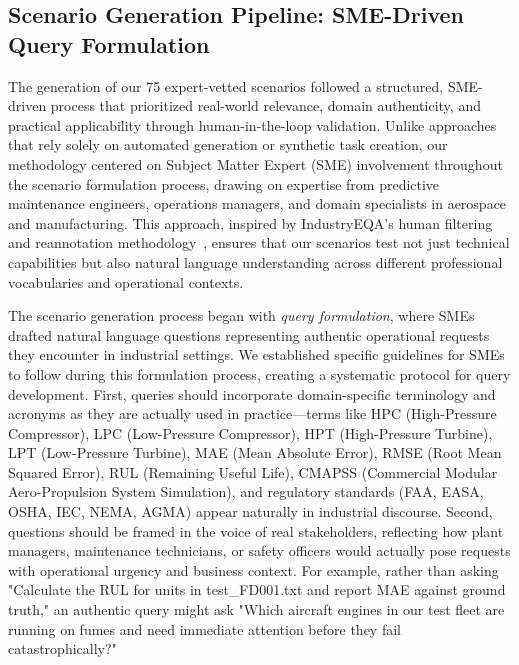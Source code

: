 \documentclass[sigconf]{acmart}
\begin{document}
\subsection{Scenario Generation Pipeline: SME-Driven Query Formulation}
\label{subsec:generation}

The generation of our 75 expert-vetted scenarios followed a structured, SME-driven process that prioritized real-world relevance, domain authenticity, and practical applicability through human-in-the-loop validation. Unlike approaches that rely solely on automated generation or synthetic task creation, our methodology centered on Subject Matter Expert (SME) involvement throughout the scenario formulation process, drawing on expertise from predictive maintenance engineers, operations managers, and domain specialists in aerospace and manufacturing. This approach, inspired by IndustryEQA's human filtering and reannotation methodology~\cite{li2025industryeqa}, ensures that our scenarios test not just technical capabilities but also natural language understanding across different professional vocabularies and operational contexts.

The scenario generation process began with \textit{query formulation}, where SMEs drafted natural language questions representing authentic operational requests they encounter in industrial settings. We established specific guidelines for SMEs to follow during this formulation process, creating a systematic protocol for query development. First, queries should incorporate domain-specific terminology and acronyms as they are actually used in practice---terms like HPC (High-Pressure Compressor), LPC (Low-Pressure Compressor), HPT (High-Pressure Turbine), LPT (Low-Pressure Turbine), MAE (Mean Absolute Error), RMSE (Root Mean Squared Error), RUL (Remaining Useful Life), CMAPSS (Commercial Modular Aero-Propulsion System Simulation), and regulatory standards (FAA, EASA, OSHA, IEC, NEMA, AGMA) appear naturally in industrial discourse. Second, questions should be framed in the voice of real stakeholders, reflecting how plant managers, maintenance technicians, or safety officers would actually pose requests with operational urgency and business context. For example, rather than asking "Calculate the RUL for units in test\_FD001.txt and report MAE against ground truth," an authentic query might ask "Which aircraft engines in our test fleet are running on fumes and need immediate attention before they fail catastrophically?"
\end{document}
